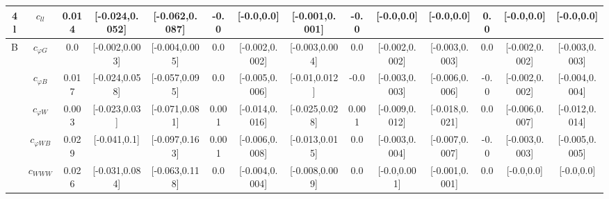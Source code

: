 \documentclass{article}
\begin{document}
\begin{table}[H]
\begin{tabular}{|c|c|c|c|c|c|c|c|c|c|c|c|c|c|}
\hline
\multirow{1}{*}{4l}
 & $c_{ll}$ & 0.014                             & [-0.024,0.052]                                 & [-0.062,0.087] & -0.0                             & [-0.0,0.0]                                 & [-0.001,0.001] & -0.0                             & [-0.0,0.0]                                 & [-0.0,0.0] & 0.0                             & [-0.0,0.0]                                 & [-0.0,0.0] \\ \cline{2-14}
\hline
\multirow{7}{*}{B}
 & $c_{\varphi G}$ & 0.0                             & [-0.002,0.003]                                 & [-0.004,0.005] & 0.0                             & [-0.002,0.002]                                 & [-0.003,0.004] & 0.0                             & [-0.002,0.002]                                 & [-0.003,0.003] & 0.0                             & [-0.002,0.002]                                 & [-0.003,0.003] \\ \cline{2-14}
 & $c_{\varphi B}$ & 0.017                             & [-0.024,0.058]                                 & [-0.057,0.095] & 0.0                             & [-0.005,0.006]                                 & [-0.01,0.012] & -0.0                             & [-0.003,0.003]                                 & [-0.006,0.006] & -0.0                             & [-0.002,0.002]                                 & [-0.004,0.004] \\ \cline{2-14}
 & $c_{\varphi W}$ & 0.003                             & [-0.023,0.03]                                 & [-0.071,0.081] & 0.001                             & [-0.014,0.016]                                 & [-0.025,0.028] & 0.001                             & [-0.009,0.012]                                 & [-0.018,0.021] & 0.0                             & [-0.006,0.007]                                 & [-0.012,0.014] \\ \cline{2-14}
 & $c_{\varphi WB}$ & 0.029                             & [-0.041,0.1]                                 & [-0.097,0.163] & 0.001                             & [-0.006,0.008]                                 & [-0.013,0.015] & 0.0                             & [-0.003,0.004]                                 & [-0.007,0.007] & -0.0                             & [-0.003,0.003]                                 & [-0.005,0.005] \\ \cline{2-14}
 & $c_{WWW}$ & 0.026                             & [-0.031,0.084]                                 & [-0.063,0.118] & 0.0                             & [-0.004,0.004]                                 & [-0.008,0.009] & 0.0                             & [-0.0,0.001]                                 & [-0.001,0.001] & 0.0                             & [-0.0,0.0]                                 & [-0.0,0.0] \\ \cline{2-14}

\end{tabular}
\end{table}
\end{document}
